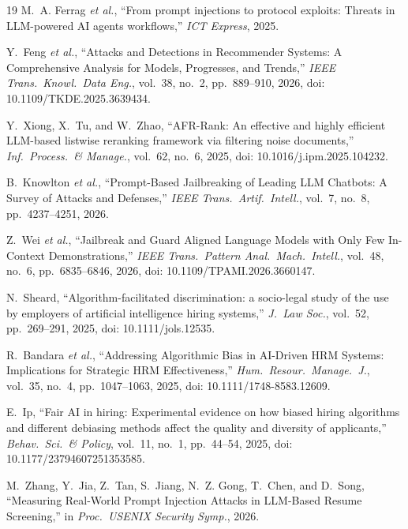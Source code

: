 \documentclass[journal]{IEEEtran}
\begin{document}
\begin{thebibliography}{19}
M.~A. Ferrag \emph{et al.}, ``From prompt injections to protocol exploits: Threats in LLM-powered AI agents workflows,'' \emph{ICT Express}, 2025.

Y.~Feng \emph{et al.}, ``Attacks and Detections in Recommender Systems: A Comprehensive Analysis for Models, Progresses, and Trends,'' \emph{IEEE Trans.\ Knowl.\ Data Eng.}, vol.~38, no.~2, pp.~889--910, 2026, doi: 10.1109/TKDE.2025.3639434.

Y.~Xiong, X.~Tu, and W.~Zhao, ``AFR-Rank: An effective and highly efficient LLM-based listwise reranking framework via filtering noise documents,'' \emph{Inf.\ Process.\ \& Manage.}, vol.~62, no.~6, 2025, doi: 10.1016/j.ipm.2025.104232.

B.~Knowlton \emph{et al.}, ``Prompt-Based Jailbreaking of Leading LLM Chatbots: A Survey of Attacks and Defenses,'' \emph{IEEE Trans.\ Artif.\ Intell.}, vol.~7, no.~8, pp.~4237--4251, 2026.

Z.~Wei \emph{et al.}, ``Jailbreak and Guard Aligned Language Models with Only Few In-Context Demonstrations,'' \emph{IEEE Trans.\ Pattern Anal.\ Mach.\ Intell.}, vol.~48, no.~6, pp.~6835--6846, 2026, doi: 10.1109/TPAMI.2026.3660147.

N.~Sheard, ``Algorithm-facilitated discrimination: a socio-legal study of the use by employers of artificial intelligence hiring systems,'' \emph{J.\ Law Soc.}, vol.~52, pp.~269--291, 2025, doi: 10.1111/jols.12535.

R.~Bandara \emph{et al.}, ``Addressing Algorithmic Bias in AI-Driven HRM Systems: Implications for Strategic HRM Effectiveness,'' \emph{Hum.\ Resour.\ Manage.\ J.}, vol.~35, no.~4, pp.~1047--1063, 2025, doi: 10.1111/1748-8583.12609.

E.~Ip, ``Fair AI in hiring: Experimental evidence on how biased hiring algorithms and different debiasing methods affect the quality and diversity of applicants,'' \emph{Behav.\ Sci.\ \& Policy}, vol.~11, no.~1, pp.~44--54, 2025, doi: 10.1177/23794607251353585.

M.~Zhang, Y.~Jia, Z.~Tan, S.~Jiang, N.~Z. Gong, T.~Chen, and D.~Song, ``Measuring Real-World Prompt Injection Attacks in LLM-Based Resume Screening,'' in \emph{Proc.\ USENIX Security Symp.}, 2026.

\end{thebibliography}
\end{document}
